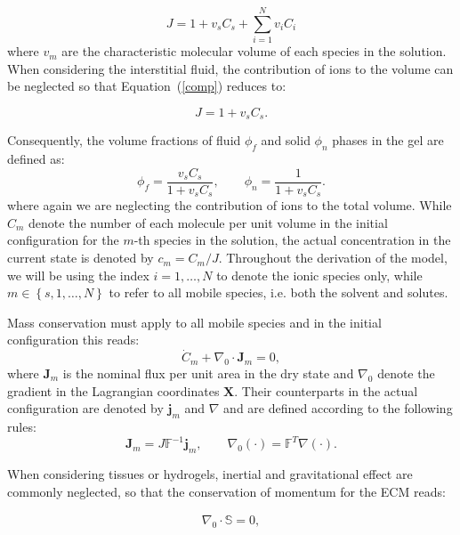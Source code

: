 \documentclass[runningheads]{llncs}
\newcommand{\F}{\ensuremath{\mathbb{F}}}
\begin{document}
\begin{equation}
 J= 1 + v_s C_s +\sum\limits_{i=1}^{N} v_i C_i
 \label{comp}
\end{equation}
where $v_m$ are the characteristic molecular volume of each species in the solution. When considering the interstitial fluid, the contribution of ions to the volume can be neglected \cite{ecm1,ecm2} so that Equation~(\ref{comp}) reduces to:

\begin{equation}
J=1+v_s C_s.
\label{inc}
\end{equation} 

Consequently, the volume fractions of fluid $\phi_f$ and solid $\phi_n$ phases in the gel are defined as:
\begin{equation}
\phi_f = \frac{v_sC_s}{1+v_sC_s}, \qquad \phi_n = \frac{1}{1+v_sC_s}.
\end{equation}
where again we are neglecting the contribution of ions to the total volume.
While $C_m$ denote the number of each molecule per unit volume in the initial configuration for the $m$-th species in the solution, the actual concentration in the current state is denoted by $c_m=C_m/J$. Throughout the derivation of the model, we will be using the index $i=1,\ldots,N$ to denote the ionic species only, while $m\in\left\{s,1,\ldots,N\right\}$ to refer to all mobile species, i.e. both the solvent and solutes.

Mass conservation must apply to all mobile species and in the initial configuration this reads:
\begin{equation}
\dot{C}_m + \nabla_0 \cdot \mathbf{J}_m = 0, \label{consmass}
\end{equation}
where $\mathbf{J}_m$ is the nominal flux per unit area in the dry state and $\nabla_0$ denote the gradient in the Lagrangian coordinates $\mathbf{X}$. Their counterparts in the actual configuration are denoted by $\mathbf{j}_m$ and $\nabla$ and are defined according to the following rules:
\begin{equation}
\mathbf{J}_m = J \F^{-1} \mathbf{j}_m, \qquad \nabla_0 (\cdot) = \F^{T} \nabla(\cdot).
\end{equation}

When considering tissues or hydrogels, inertial and gravitational effect are commonly neglected, so that the conservation of momentum for the ECM reads:

\begin{gather}
\nabla_0 \cdot \mathbb{S}=0\label{consmom},
\end{gather}
\end{document}
